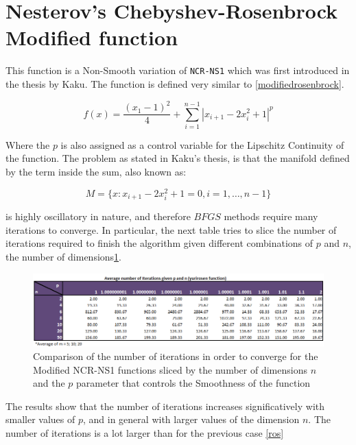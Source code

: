\section{Nesterov's Chebyshev-Rosenbrock Modified function}

This function is a Non-Smooth variation of \texttt{NCR-NS1} which was first introduced in the thesis by Kaku\citep{kaku}. The function is defined very similar to \ref{modifiedrosenbrock}.

\begin{equation} \label{modifiedyurirosen}
    f(x) = \frac{(x_1 - 1)^2}{4} + \sum_{i = 1}^{n-1} |x_{i+1} - 2x_{i}^2 + 1|^p
\end{equation}

Where the $p$ is also assigned as a control variable for the Lipschitz Continuity of the function. The problem as stated in Kaku's thesis, is that the manifold defined by the term inside the sum, also known as:

\begin{equation} \label{kakumanifold}
    M = \{x: x_{i+1} - 2x_i^2 + 1 = 0, i = 1, \hdots, n-1 \}
\end{equation}

is highly oscillatory in nature, and therefore $BFGS$ methods require many iterations to converge. In particular, the next table tries to slice the number of iterations required to finish the algorithm given different combinations of $p$ and $n$, the number of dimensions\ref{yuripn}.

\begin{figure}
\begin{center}
\includegraphics[scale=0.6]{Figures/yurirosenpn.PNG}
\caption[Comparison of selected values of the Modified NCR-NS1 function sliced by p and n]{Comparison of the number of iterations in order to converge for the Modified NCR-NS1 functions sliced by the number of dimensions $n$ and the $p$ parameter that controls the Smoothness of the function}
\label{yuripn}
\end{center}
\end{figure} 

The results show that the number of iterations increases significatively with smaller values of $p$, and in general with larger values of the dimension $n$. The number of iterations is a lot larger than for the previous case \ref{ros} 

